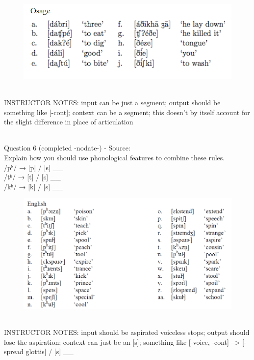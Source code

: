 \documentclass[12pt]{article}
\begin{document}
\begin{figure}[H]
\includegraphics{../images/osage.png}
\end{figure}

~\\
INSTRUCTOR NOTES: input can be just a segment; output should be something like [-cont]; context can be a segment; this doesn't by itself account for the slight difference in place of articulation


~\\

{\large Question 6} (completed -nodate-) - Source: \\

Explain how you should use phonological features to combine these rules.\\

/pʰ/ → {[p]} / {[s]} \_\_\\/tʰ/ → {[t]} / {[s]} \_\_\\/kʰ/ → {[k]} / {[s]} \_\_

\begin{figure}[H]
\includegraphics{../images/english_asp.png}
\end{figure}

~\\
INSTRUCTOR NOTES: input should be aspirated voiceless stops; output should lose the aspiration; context can just be an [s]; something like [-voice, -cont] --> [-spread glottis] / [s] \_\_
\end{document}
